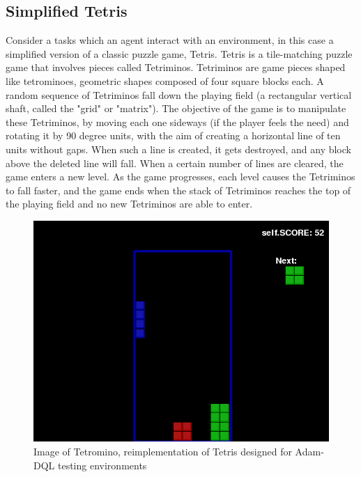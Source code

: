     \subsection{Simplified Tetris}
    
    Consider a tasks which an agent interact with an environment, in this case a simplified version of a classic puzzle game, Tetris. Tetris is a tile-matching puzzle game that involves pieces called Tetriminos. Tetriminos are game pieces shaped like tetrominoes, geometric shapes composed of four square blocks each. A random sequence of Tetriminos fall down the playing field (a rectangular vertical shaft, called the "grid" or "matrix"). The objective of the game is to manipulate these Tetriminos, by moving each one sideways (if the player feels the need) and rotating it by 90 degree units, with the aim of creating a horizontal line of ten units without gaps. When such a line is created, it gets destroyed, and any block above the deleted line will fall. When a certain number of lines are cleared, the game enters a new level. As the game progresses, each level causes the Tetriminos to fall faster, and the game ends when the stack of Tetriminos reaches the top of the playing field and no new Tetriminos are able to enter.
    
       \begin{figure}[H]
        \centering
        \includegraphics[scale=0.4]{images/tetromino.png}
        \caption{Image of Tetromino, reimplementation of Tetris designed for Adam-DQL testing environments}
        \label{fig:53}
    \end{figure}
      
